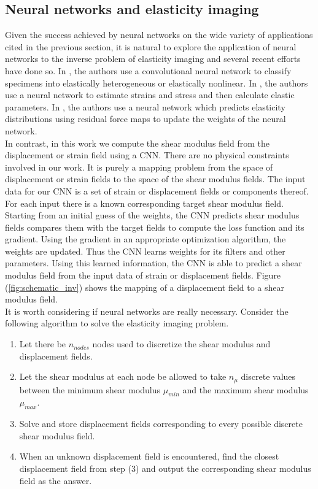 \documentclass[12pt]{article}
\begin{document}
\subsection{Neural networks and elasticity imaging}
Given the success achieved by neural networks on the wide variety of applications cited in the previous section, it is natural to explore the application of neural networks to the inverse problem of elasticity imaging and several recent efforts \cite{paper:pateloberai2019,misc:gu2020,paper:hoeriginsana2016} have done so. In \cite{paper:pateloberai2019}, the authors use a convolutional neural network to classify specimens into elastically heterogeneous or elastically nonlinear. In \cite{paper:hoeriginsana2016}, the authors use a neural network to estimate strains and stress and then calculate elastic parameters. In \cite{misc:gu2020}, the authors use a neural network which predicts elasticity distributions using residual force maps to update the weights of the neural network. \\In contrast, in this work we compute the shear modulus field from the displacement or strain field using a CNN. There are no physical constraints involved in our work. It is purely a mapping problem from the space of displacement or strain fields to the space of the shear modulus fields. The input data for our CNN is a set of strain or displacement fields or components thereof. For each input there is a known corresponding target shear modulus field. Starting from an initial guess of the weights, the CNN predicts shear modulus fields compares them with the target fields to compute the loss function and its gradient. Using the gradient in an appropriate optimization algorithm, the weights are updated. Thus the CNN learns weights for its filters and other parameters. Using this learned information, the CNN is able to predict a shear modulus field from the input data of strain or displacement fields. Figure (\ref{fig:schematic_inv}) shows the mapping of a displacement field to a shear modulus field.\\
It is worth considering if neural networks are really necessary. Consider the following algorithm to solve the elasticity imaging problem.
%
\begin{enumerate}
\item{Let there be $n_{nodes}$ nodes used to discretize the shear modulus and displacement fields.}
\item{Let the shear modulus at each node be allowed to take $n_{\mu}$ discrete values between the minimum shear modulus $\mu_{min}$ and the maximum shear modulus $\mu_{max}$.}
\item{Solve and store displacement fields corresponding to every possible discrete shear modulus field.}
\item{When an unknown displacement field is encountered, find the closest displacement field from step (3) and output the corresponding shear modulus field as the answer.}
\end{enumerate}
\end{document}
